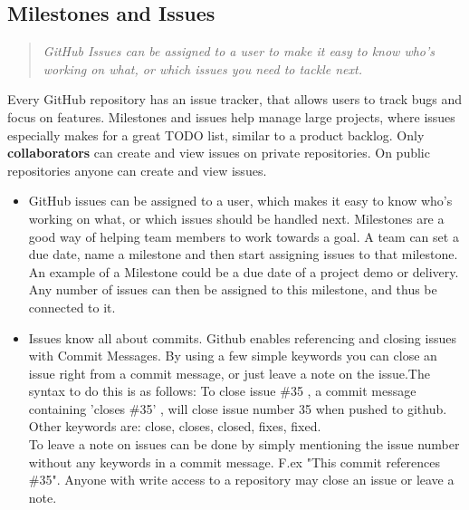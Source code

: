 \subsection{Milestones and Issues}
\begin{quote}
\em GitHub Issues can be assigned to a user to make it easy to know who's working on what, or which issues you need to tackle next.
\end{quote}
Every GitHub repository has an issue tracker, that allows users to track bugs and focus on features. Milestones and issues help manage large projects, where issues especially makes for a great TODO list, similar to a product backlog. Only {\bf collaborators} can create and view issues on private repositories. On public repositories anyone can create and view issues. 
\begin{itemize}
\item GitHub issues can be assigned to a user, which makes it easy to know who's working on what, or which issues should be handled next. Milestones are a good way of helping team members to work towards a goal. A team can set a due date, name a milestone and then start assigning issues to that milestone. An example of a Milestone could be a due date of a project demo or delivery. Any number of issues can then be assigned to this milestone, and thus be connected to it. 
\item Issues know all about commits. Github enables referencing and closing issues with Commit Messages. By using a few simple keywords you can close an issue right from a commit message, or just leave a note on the issue.The syntax to do this is as follows: To close issue \#35 , a commit message containing 'closes \#35' , will close issue number 35 when pushed to github. Other keywords are: close, closes, closed, fixes, fixed. \\
To leave a note on issues can be done by simply mentioning the issue number without any keywords in a commit message. F.ex "This commit references \#35". Anyone with write access to a repository may close an issue or leave a note.
\end{itemize}

